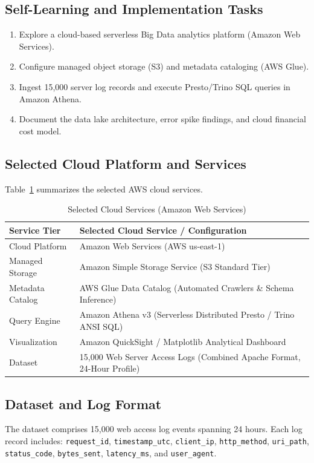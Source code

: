 \documentclass[12pt,a4paper]{report}
\begin{document}
\subsection{Self-Learning and Implementation Tasks}
\begin{enumerate}
    \item Explore a cloud-based serverless Big Data analytics platform (Amazon Web Services).
    \item Configure managed object storage (S3) and metadata cataloging (AWS Glue).
    \item Ingest 15,000 server log records and execute Presto/Trino SQL queries in Amazon Athena.
    \item Document the data lake architecture, error spike findings, and cloud financial cost model.
\end{enumerate}

\subsection{Selected Cloud Platform and Services}
Table~\ref{tab:cloud_services} summarizes the selected AWS cloud services.

\begin{table}[H]
\centering
\caption{Selected Cloud Services (Amazon Web Services)}
\label{tab:cloud_services}
\begin{tabularx}{\textwidth}{|l|X|}
\hline
\textbf{Service Tier} & \textbf{Selected Cloud Service / Configuration}\\
\hline
Cloud Platform & Amazon Web Services (AWS us-east-1)\\
\hline
Managed Storage & Amazon Simple Storage Service (S3 Standard Tier)\\
\hline
Metadata Catalog & AWS Glue Data Catalog (Automated Crawlers \& Schema Inference)\\
\hline
Query Engine & Amazon Athena v3 (Serverless Distributed Presto / Trino ANSI SQL)\\
\hline
Visualization & Amazon QuickSight / Matplotlib Analytical Dashboard\\
\hline
Dataset & 15,000 Web Server Access Logs (Combined Apache Format, 24-Hour Profile)\\
\hline
\end{tabularx}
\end{table}

\subsection{Dataset and Log Format}
The dataset comprises 15,000 web access log events spanning 24 hours. Each log record includes: \texttt{request\_id}, \texttt{timestamp\_utc}, \texttt{client\_ip}, \texttt{http\_method}, \texttt{uri\_path}, \texttt{status\_code}, \texttt{bytes\_sent}, \texttt{latency\_ms}, and \texttt{user\_agent}.
\end{document}
